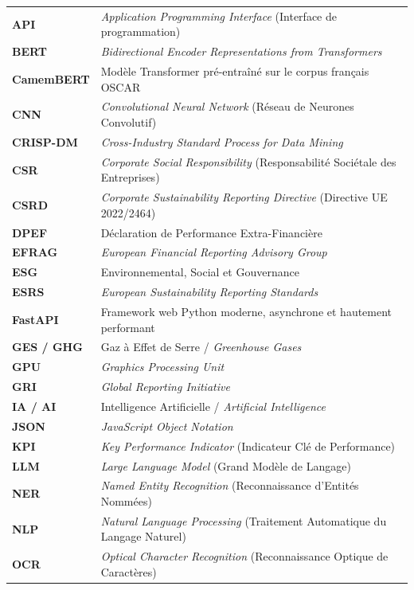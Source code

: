 \documentclass[12pt,a4paper]{report}
\begin{document}
\begin{longtable}{p{3.2cm}p{11.5cm}}
\textbf{API} & \textit{Application Programming Interface} (Interface de programmation) \\
\textbf{BERT} & \textit{Bidirectional Encoder Representations from Transformers} \\
\textbf{CamemBERT} & Modèle Transformer pré-entraîné sur le corpus français OSCAR \\
\textbf{CNN} & \textit{Convolutional Neural Network} (Réseau de Neurones Convolutif) \\
\textbf{CRISP-DM} & \textit{Cross-Industry Standard Process for Data Mining} \\
\textbf{CSR} & \textit{Corporate Social Responsibility} (Responsabilité Sociétale des Entreprises) \\
\textbf{CSRD} & \textit{Corporate Sustainability Reporting Directive} (Directive UE 2022/2464) \\
\textbf{DPEF} & Déclaration de Performance Extra-Financière \\
\textbf{EFRAG} & \textit{European Financial Reporting Advisory Group} \\
\textbf{ESG} & Environnemental, Social et Gouvernance \\
\textbf{ESRS} & \textit{European Sustainability Reporting Standards} \\
\textbf{FastAPI} & Framework web Python moderne, asynchrone et hautement performant \\
\textbf{GES / GHG} & Gaz à Effet de Serre / \textit{Greenhouse Gases} \\
\textbf{GPU} & \textit{Graphics Processing Unit} \\
\textbf{GRI} & \textit{Global Reporting Initiative} \\
\textbf{IA / AI} & Intelligence Artificielle / \textit{Artificial Intelligence} \\
\textbf{JSON} & \textit{JavaScript Object Notation} \\
\textbf{KPI} & \textit{Key Performance Indicator} (Indicateur Clé de Performance) \\
\textbf{LLM} & \textit{Large Language Model} (Grand Modèle de Langage) \\
\textbf{NER} & \textit{Named Entity Recognition} (Reconnaissance d'Entités Nommées) \\
\textbf{NLP} & \textit{Natural Language Processing} (Traitement Automatique du Langage Naturel) \\
\textbf{OCR} & \textit{Optical Character Recognition} (Reconnaissance Optique de Caractères) \\

\end{longtable}
\end{document}
